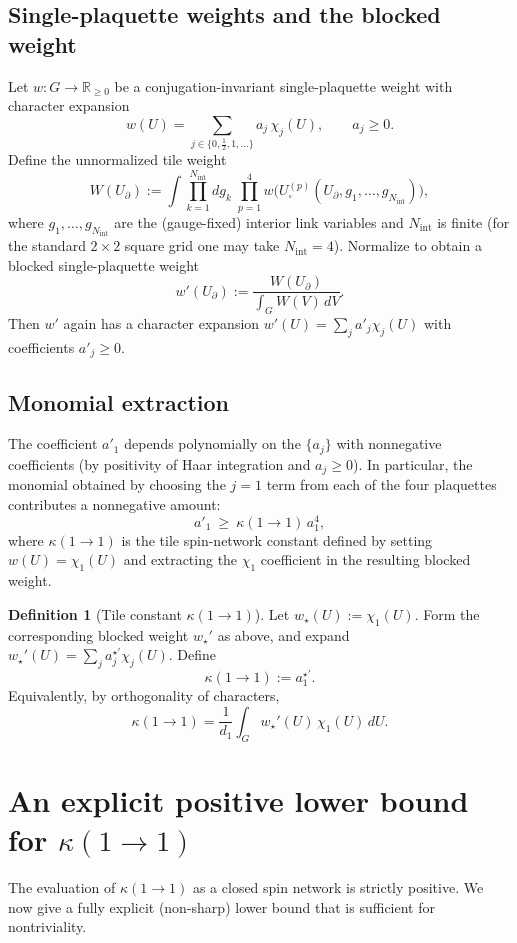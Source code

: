 \documentclass[11pt]{article}
\theoremstyle{definition}
\newtheorem{definition}[theorem]{Definition}
\newcommand{\1}{\mathbf{1}}
\begin{document}
\subsection{Single-plaquette weights and the blocked weight}
Let $w:G\to\mathbb R_{\ge 0}$ be a conjugation-invariant single-plaquette weight with character expansion
\[
 w(U)=\sum_{j\in\{0,\frac12,1,\dots\}} a_j\,\chi_j(U),\qquad a_j\ge 0.
\]
Define the unnormalized tile weight
\[
W(U_{\partial}) := \int \prod_{k=1}^{N_{\mathrm{int}}} dg_k\; \prod_{p=1}^4 w\big(U_{\square}^{(p)}(U_{\partial},g_1,\dots,g_{N_{\mathrm{int}}})\big),
\]
where $g_1,\dots,g_{N_{\mathrm{int}}}$ are the (gauge-fixed) interior link variables and $N_{\mathrm{int}}$ is finite (for the standard $2\times2$ square grid one may take $N_{\mathrm{int}}=4$).
Normalize to obtain a blocked single-plaquette weight
\[
 w'(U_{\partial}) := \frac{W(U_{\partial})}{\int_G W(V)\,dV}.
\]
Then $w'$ again has a character expansion $w'(U)=\sum_j a'_j\chi_j(U)$ with coefficients $a'_j\ge 0$.

\subsection{Monomial extraction}
The coefficient $a'_1$ depends polynomially on the $\{a_j\}$ with nonnegative coefficients (by positivity of Haar integration and $a_j\ge0$). In particular, the monomial obtained by choosing the $j=1$ term from each of the four plaquettes contributes a nonnegative amount:
\[
 a'_1 \ \ge\ \kappa(1\to 1)\,a_1^4,
\]
where $\kappa(1\to1)$ is the tile spin-network constant defined by setting $w(U)=\chi_1(U)$ and extracting the $\chi_1$ coefficient in the resulting blocked weight.

\begin{definition}[Tile constant $\kappa(1\to 1)$]
Let $w_\star(U):=\chi_1(U)$. Form the corresponding blocked weight $w_\star'$ as above, and expand $w_\star'(U)=\sum_j a^{\star\prime}_j\chi_j(U)$. Define
\[
\kappa(1\to 1):=a^{\star\prime}_1.
\]
Equivalently, by orthogonality of characters,
\[
\kappa(1\to 1)=\frac{1}{d_1}\int_G w_\star'(U)\,\chi_1(U)\,dU.
\]
\end{definition}

\section{An explicit positive lower bound for $\kappa(1\to1)$}
The evaluation of $\kappa(1\to1)$ as a closed spin network is strictly positive. We now give a fully explicit (non-sharp) lower bound that is sufficient for nontriviality.
\end{document}
